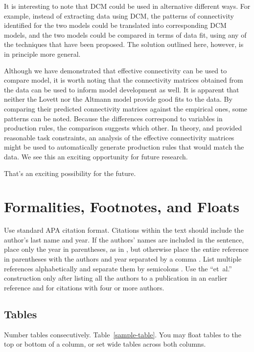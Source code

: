\documentclass[10pt,letterpaper]{article}
\begin{document}
It is interesting to note that DCM could be used in alternative different ways. For example, instead of extracting data using DCM, the patterns of connectivity identified for the two models could be translated into corresponding DCM models, and the two models could be compared in terms of data fit, using any of the techniques that have been proposed. The solution outlined here, however, is in principle more general.

Although we have demonstrated that effective connectivity can be used to compare model, it is worth noting that the connectivity matrices obtained from the data can be used to inform model development as well. It is apparent that neither the Lovett nor the Altmann model provide good fits to the data. By comparing their predicted connectivity matrices against the empirical ones, some patterns can be noted. Because the differences correspond to variables in production rules, the comparison suggests which other. In theory, and provided reasonable task constraints, an analysis of the effective connectivity matrices might be used to automatically generate production rules that would match the data. We see this an exciting opportunity for future research.

That's an exciting possibility for the future.

\section{Formalities, Footnotes, and Floats}

Use standard APA citation format. Citations within the text should
include the author's last name and year. If the authors' names are
included in the sentence, place only the year in parentheses, as in
, but otherwise place the entire reference in
parentheses with the authors and year separated by a comma
\cite{NewellSimon1972a}. List multiple references alphabetically and
separate them by semicolons
\cite{ChalnickBillman1988a,NewellSimon1972a}. Use the
``et~al.'' construction only after listing all the authors to a
publication in an earlier reference and for citations with four or
more authors.


\subsection{Tables}

Number tables consecutively. Table~\ref{sample-table}. You may float
tables to the top or bottom of a column, or set wide tables across
both columns.
\end{document}
